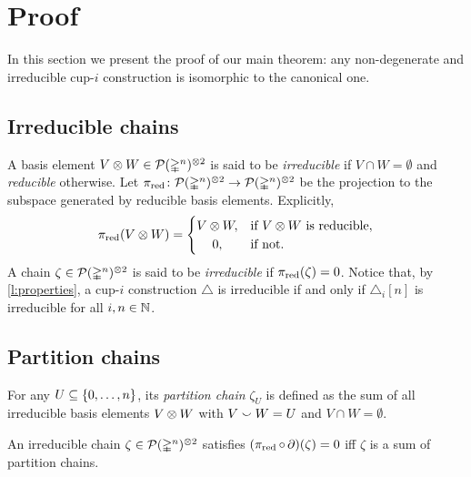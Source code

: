 
\section{Proof}\label{s:proof}

In this section we present the proof of our main theorem: any non-degenerate and irreducible \mbox{cup-$i$} construction is isomorphic to the canonical one.

\subsection{Irreducible chains}

A basis element $V \otimes W \in \mathcal{P}(\mathbb{\Delta}^n)^{\otimes 2}$ is said to be \textit{irreducible} if $V \cap W = \emptyset$ and \textit{reducible} otherwise.
Let $\operatorname{\pi_{\text{red}}} \colon \mathcal{P}(\mathbb{\Delta}^n)^{\otimes 2} \to \mathcal{P}(\mathbb{\Delta}^n)^{\otimes 2}$ be the projection to the subspace generated by reducible basis elements.
Explicitly,
\[
\pired(V \ot W) =
\begin{cases}
	V \ot W, & \text{if $V \ot W$ is reducible},\\
	\hfil 0, & \text{if not}.
\end{cases}
\]
A chain $\zeta \in \mathcal{P}(\mathbb{\Delta}^n)^{\otimes 2}$ is said to be \textit{irreducible} if $\operatorname{\pi_{\text{red}}}(\zeta) = 0$.
Notice that, by \cref{l:properties}, a cup-$i$ construction $\triangle$ is irreducible if and only if $\triangle_i[n]$ is irreducible for all $i, n \in \mathbb{N}$.

\subsection{Partition chains}

For any $U \subseteq \{0,\dots,n\}$, its \textit{partition chain} $\zeta_U$ is defined as the sum of all irreducible basis elements $V \otimes W$ with $V \union W = U$ and $V \cap W = \emptyset$.

\begin{lemma}\label{l:partition chains}
	An irreducible chain $\zeta \in \mathcal{P}(\mathbb{\Delta}^n)^{\otimes 2}$ satisfies $(\operatorname{\pi_{\text{red}}} \circ \operatorname{\partial})(\zeta) = 0$ iff $\zeta$ is a sum of partition chains.
\end{lemma}

